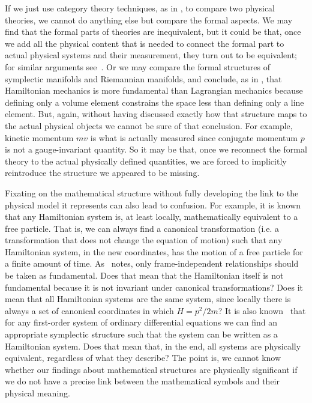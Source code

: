 \documentclass[11pt]{article}
\begin{document}
If we just use category theory techniques, as in \cite{Barrett2}, to compare two physical theories, we cannot do anything else but compare the formal aspects. We may find that the formal parts of theories are inequivalent, but it could be that, once we add all the physical content that is needed to connect the formal part to actual physical systems and their measurement, they turn out to be equivalent; for similar arguments see~\cite{Coffey}. Or we may compare the formal structures of symplectic manifolds and Riemannian manifolds, and conclude, as in \cite{North}, that Hamiltonian mechanics is more fundamental than Lagrangian mechanics because defining only a volume element constrains the space less than defining only a line element. But, again, without having discussed exactly how that structure maps to the actual physical objects we cannot be sure of that conclusion. For example, kinetic momentum $mv$ is what is actually measured since conjugate momentum $p$ is not a gauge-invariant quantity. So it may be that, once we reconnect the formal theory to the actual physically defined quantities, we are forced to implicitly reintroduce the structure we appeared to be missing. 

Fixating on the mathematical structure without fully developing the link to the physical model it represents can also lead to confusion. For example, it is known~\cite{AllHamFreeParticle} that any Hamiltonian system is, at least locally, mathematically equivalent to a free particle. That is, we can always find a canonical transformation (i.e. a transformation that does not change the equation of motion) such that any Hamiltonian system, in the new coordinates, has the motion of a free particle for a finite amount of time. As~\cite{North} notes, only frame-independent relationships should be taken as fundamental. Does that mean that the Hamiltonian itself is not fundamental because it is not invariant under canonical transformations? Does it mean that all Hamiltonian systems are the same system, since locally there is always a set of canonical coordinates in which $H=p^2/2m$? It is also known~\cite{AllSystemsAreHam} that for any first-order system of ordinary differential equations we can find an appropriate symplectic structure such that the system can be written as a Hamiltonian system. Does that mean that, in the end, all systems are physically equivalent, regardless of what they describe? The point is, we cannot know whether our findings about mathematical structures are physically significant if we do not have a precise link between the mathematical symbols and their physical meaning.
\end{document}
